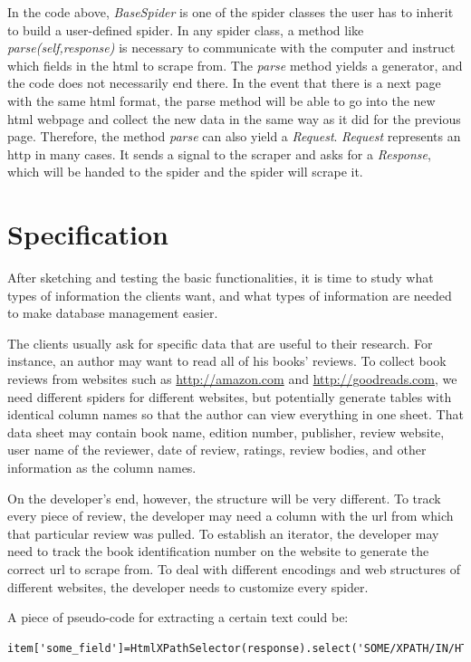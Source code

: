 \documentclass[12pt]{report}
\begin{document}
In the code above, \textit{BaseSpider} is one of the spider classes the user has to inherit to build a user-defined spider. In any spider class, a method like \textit{parse(self,response)} is necessary to communicate with the computer and instruct which fields in the html to scrape from. The \textit{parse} method yields a generator, and the code does not necessarily end there. In the event that there is a next page with the same html format, the parse method will be able to go into the new html webpage and collect the new data in the same way as it did for the previous page. Therefore, the method \textit{parse} can also yield a \textit{Request}. \textit{Request} represents an \gls{http} in many cases. It sends a signal to the scraper and asks for a \textit{Response}, which will be handed to the spider and the spider will scrape it.

\section{Specification}

After sketching and testing the basic functionalities, it is time to study what types of information the clients want, and what types of information are needed to make database management easier. 

The clients usually ask for specific data that are useful to their research. For instance, an author may want to read all of his books' reviews. To collect book reviews from websites such as \url{http://amazon.com} and \url{http://goodreads.com}, we need different spiders for different websites, but potentially generate tables with identical column names so that the author can view everything in one sheet. That data sheet may contain book name, edition number, publisher, review website, user name of the reviewer, date of review, ratings, review bodies, and other information as the column names.

On the developer's end, however, the structure will be very different. To track every piece of review, the developer may need a column with the url from which that particular review was pulled. To establish an iterator, the developer may need to track the book identification number on the website to generate the correct url to scrape from. To deal with different encodings and web structures of different websites, the developer needs to customize every spider.

A piece of pseudo-code for extracting a certain text could be:
\begin{lstlisting}
item['some_field']=HtmlXPathSelector(response).select('SOME/XPATH/IN/HTML/text()').extract()
\end{lstlisting}
\end{document}
